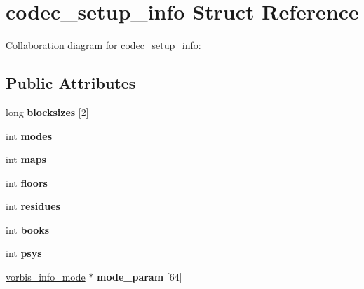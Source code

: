 \hypertarget{structcodec__setup__info}{\section{codec\+\_\+setup\+\_\+info Struct Reference}
\label{structcodec__setup__info}
}


Collaboration diagram for codec\+\_\+setup\+\_\+info\+:
\subsection*{Public Attributes}
\begin{DoxyCompactItemize}
\item 
\hypertarget{structcodec__setup__info_a8b08129139f671b7bbd9573aa2576fe9}{long {\bfseries blocksizes} \mbox{[}2\mbox{]}}\label{structcodec__setup__info_a8b08129139f671b7bbd9573aa2576fe9}

\item 
\hypertarget{structcodec__setup__info_a922009abe4668e454cc238a6c27b337d}{int {\bfseries modes}}\label{structcodec__setup__info_a922009abe4668e454cc238a6c27b337d}

\item 
\hypertarget{structcodec__setup__info_a0631814413bb5e4cad9d6c34abea2d25}{int {\bfseries maps}}\label{structcodec__setup__info_a0631814413bb5e4cad9d6c34abea2d25}

\item 
\hypertarget{structcodec__setup__info_a07326866bbd3e16ba395995c47f1afe5}{int {\bfseries floors}}\label{structcodec__setup__info_a07326866bbd3e16ba395995c47f1afe5}

\item 
\hypertarget{structcodec__setup__info_af730d6d8181fb830badaf26b6b688afb}{int {\bfseries residues}}\label{structcodec__setup__info_af730d6d8181fb830badaf26b6b688afb}

\item 
\hypertarget{structcodec__setup__info_a2a1ae7d41f735899ade353d16b5163d1}{int {\bfseries books}}\label{structcodec__setup__info_a2a1ae7d41f735899ade353d16b5163d1}

\item 
\hypertarget{structcodec__setup__info_a0ff85713fe3d4d57b0fe0acd86764e6e}{int {\bfseries psys}}\label{structcodec__setup__info_a0ff85713fe3d4d57b0fe0acd86764e6e}

\item 
\hypertarget{structcodec__setup__info_a40fc25e41a2e10422b5004f322d1d110}{\hyperlink{structvorbis__info__mode}{vorbis\+\_\+info\+\_\+mode} $\ast$ {\bfseries mode\+\_\+param} \mbox{[}64\mbox{]}}\label{structcodec__setup__info_a40fc25e41a2e10422b5004f322d1d110}


\end{DoxyCompactItemize}
